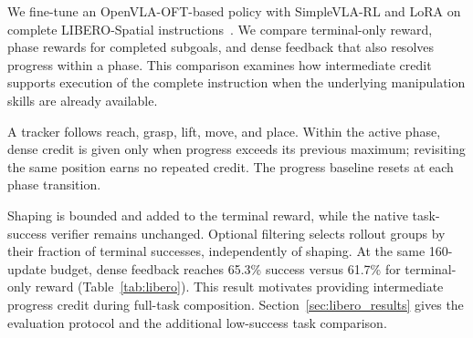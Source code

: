 \label{sec:dense_method}
We fine-tune an OpenVLA-OFT-based policy with SimpleVLA-RL and LoRA on complete LIBERO-Spatial instructions~\cite{openvlaoft,simplevlarl,libero}. We compare terminal-only reward, phase rewards for completed subgoals, and dense feedback that also resolves progress within a phase. This comparison examines how intermediate credit supports execution of the complete instruction when the underlying manipulation skills are already available.

A tracker follows reach, grasp, lift, move, and place. Within the active phase, dense credit is given only when progress exceeds its previous maximum; revisiting the same position earns no repeated credit. The progress baseline resets at each phase transition.

Shaping is bounded and added to the terminal reward, while the native task-success verifier remains unchanged. Optional filtering selects rollout groups by their fraction of terminal successes, independently of shaping. At the same 160-update budget, dense feedback reaches 65.3\% success versus 61.7\% for terminal-only reward (Table~\ref{tab:libero}). This result motivates providing intermediate progress credit during full-task composition. Section~\ref{sec:libero_results} gives the evaluation protocol and the additional low-success task comparison.
